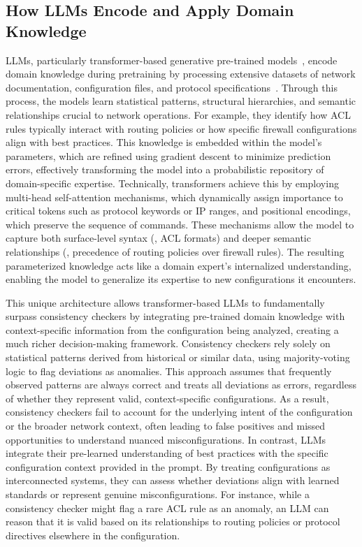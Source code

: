 \subsection{How LLMs Encode and Apply Domain Knowledge}

LLMs, particularly transformer-based generative pre-trained models~\cite{vaswani2017attention,hill2024transformers,lin2022survey}, encode domain knowledge during pretraining by processing extensive datasets of network documentation, configuration files, and protocol specifications~\cite{qiu2020pre,achiam2023gpt,touvron2023llama,brown2020language}. Through this process, the models learn statistical patterns, structural hierarchies, and semantic relationships crucial to network operations. For example, they identify how ACL rules typically interact with routing policies or how specific firewall configurations align with best practices. This knowledge is embedded within the model’s parameters, which are refined using gradient descent to minimize prediction errors, effectively transforming the model into a probabilistic repository of domain-specific expertise.
Technically, transformers achieve this by employing multi-head self-attention mechanisms, which dynamically assign importance to critical tokens such as protocol keywords or IP ranges, and positional encodings, which preserve the sequence of commands. These mechanisms allow the model to capture both surface-level syntax (\eg, ACL formats) and deeper semantic relationships (\eg, precedence of routing policies over firewall rules). The resulting parameterized knowledge acts like a domain expert’s internalized understanding, enabling the model to generalize its expertise to new configurations it encounters.

This unique architecture allows transformer-based LLMs to fundamentally surpass consistency checkers by integrating pre-trained domain knowledge with context-specific information from the configuration being analyzed, creating a much richer decision-making framework. Consistency checkers rely solely on statistical patterns derived from historical or similar data, using majority-voting logic to flag deviations as anomalies. This approach assumes that frequently observed patterns are always correct and treats all deviations as errors, regardless of whether they represent valid, context-specific configurations. As a result, consistency checkers fail to account for the underlying intent of the configuration or the broader network context, often leading to false positives and missed opportunities to understand nuanced misconfigurations.
In contrast, LLMs integrate their pre-learned understanding of best practices with the specific configuration context provided in the prompt. By treating configurations as interconnected systems, they can assess whether deviations align with learned standards or represent genuine misconfigurations. For instance, while a consistency checker might flag a rare ACL rule as an anomaly, an LLM can reason that it is valid based on its relationships to routing policies or protocol directives elsewhere in the configuration.

